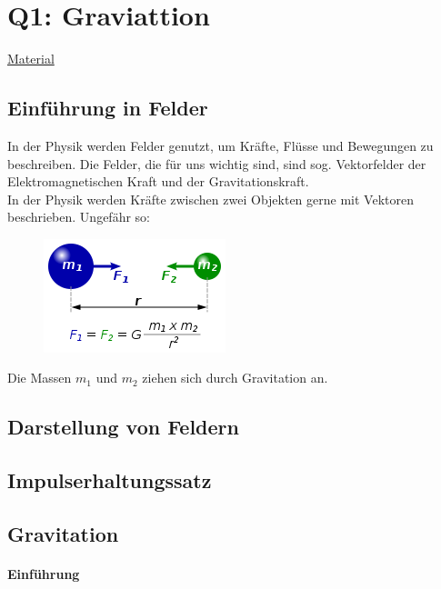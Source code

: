 \documentclass{article}
\begin{document}
    \section{Q1: Graviattion}

        \href{https://gcm.schule/material/2023/physik/lk12/index_Q1.md}{Material}

        \subsection{Einführung in Felder}
            In der Physik werden Felder genutzt, um Kräfte, Flüsse und Bewegungen zu beschreiben.
            Die Felder, die für uns wichtig sind, sind sog. Vektorfelder der Elektromagnetischen Kraft
            und der Gravitationskraft. \\
            In der Physik werden Kräfte zwischen zwei Objekten gerne mit Vektoren beschrieben. Ungefähr so:
            \begin{figure}[h] \label{figure3: Gravitationskraft} \includegraphics{graphics/universalGravitation.png}\end{figure}   
            Die Massen $m_1$ und $ m_2 $ ziehen sich durch Gravitation an.
        \subsection{Darstellung von Feldern}


        \subsection{Impulserhaltungssatz}
        
        \subsection{Gravitation}
        
        	\paragraph{Einführung \newline}
        	
\end{document}
